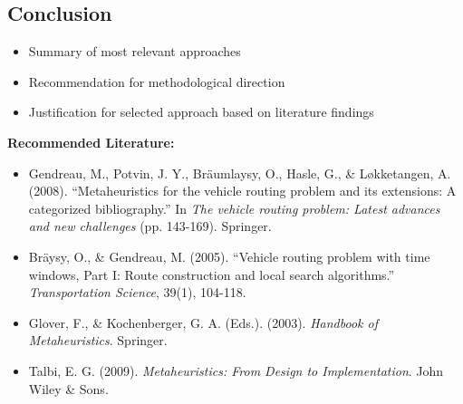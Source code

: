 \subsection{Conclusion}
\begin{itemize}
    \item Summary of most relevant approaches
    \item Recommendation for methodological direction
    \item Justification for selected approach based on literature findings
\end{itemize}

\noindent\textbf{Recommended Literature:}
\begin{itemize}
    \item Gendreau, M., Potvin, J. Y., Bräumlaysy, O., Hasle, G., \& Løkketangen, A. (2008). ``Metaheuristics for the vehicle routing problem and its extensions: A categorized bibliography.'' In \textit{The vehicle routing problem: Latest advances and new challenges} (pp. 143-169). Springer.
    \item Bräysy, O., \& Gendreau, M. (2005). ``Vehicle routing problem with time windows, Part I: Route construction and local search algorithms.'' \textit{Transportation Science}, 39(1), 104-118.
    \item Glover, F., \& Kochenberger, G. A. (Eds.). (2003). \textit{Handbook of Metaheuristics}. Springer.
    \item Talbi, E. G. (2009). \textit{Metaheuristics: From Design to Implementation}. John Wiley \& Sons.
\end{itemize}
